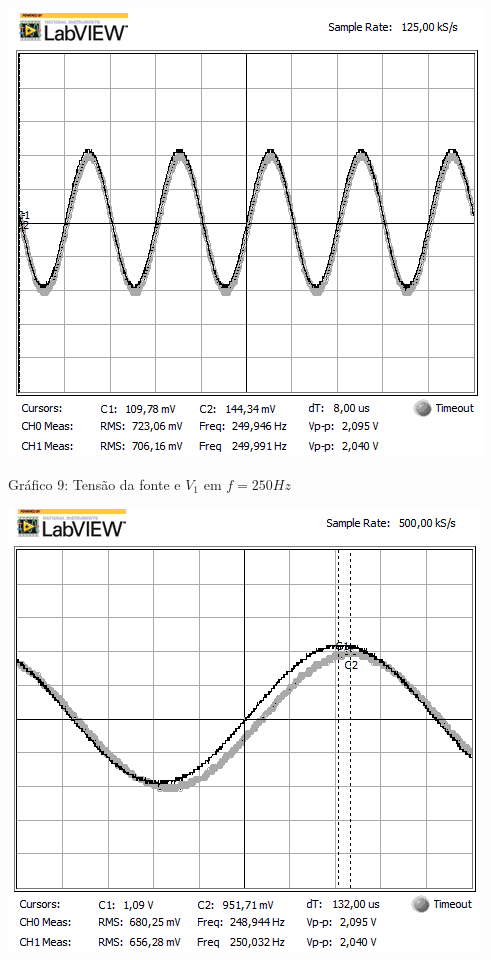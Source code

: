 \begin{table}[h]
\centering
\includegraphics[scale=0.725]{rgadicoas/rgadicoa1}
\end{table}

\begin{center}
Gráfico 9: Tensão da fonte e $V_1$ em $f=250Hz$
\end{center}

\begin{table}[h]
\centering
\includegraphics[scale=0.725]{rgadicoas/rgadicoa1-2}
\end{table}

